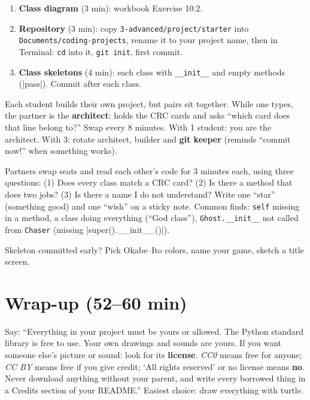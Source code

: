 \begin{enumerate}[itemsep=2pt]
  \item \textbf{Class diagram} (3 min): workbook Exercise 10.2.
  \item \textbf{Repository} (3 min): copy \texttt{3-advanced/project/starter} into \texttt{Documents/coding-projects}, rename it to your project name, then in Terminal: \texttt{cd} into it, \texttt{git init}, first commit.
  \item \textbf{Class skeletons} (4 min): each class with \texttt{\_\_init\_\_} and empty methods (\py|pass|). Commit after each class.
\end{enumerate}

\begin{pairroles}
Each student builds their own project, but pairs sit together. While one types, the partner is the \textbf{architect}: holds the CRC cards and asks \enquote{which card does that line belong to?} Swap every 8 minutes. With 1 student: you are the architect. With 3: rotate architect, builder and \textbf{git keeper} (reminds \enquote{commit now!} when something works).
\end{pairroles}

\begin{bughunt}
Partners swap seats and read each other's code for 3 minutes each, using three questions: (1) Does every class match a CRC card? (2) Is there a method that does two jobs? (3) Is there a name I do not understand? Write one \enquote{star} (something good) and one \enquote{wish} on a sticky note. Common finds: \texttt{self} missing in a method, a class doing everything (\enquote{God class}), \texttt{Ghost.\_\_init\_\_} not called from \texttt{Chaser} (missing \py|super().__init__()|).
\end{bughunt}

\begin{freebuild}
Skeleton committed early? Pick Okabe--Ito colors, name your game, sketch a title screen.
\end{freebuild}

\section{Wrap-up (52--60 min)}
\begin{safety}
Say: \enquote{Everything in your project must be yours or allowed. The Python standard library is free to use. Your own drawings and sounds are yours. If you want someone else's picture or sound: look for its \textbf{license}. \emph{CC0} means free for anyone; \emph{CC BY} means free if you give credit; \enquote{All rights reserved} or no license means \textbf{no}. Never download anything without your parent, and write every borrowed thing in a Credits section of your README.} Easiest choice: draw everything with turtle.
\end{safety}

